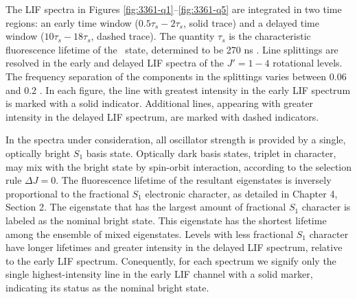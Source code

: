 \documentclass[12pt]{mitthesis}
\begin{document}
The LIF spectra in Figures \ref{fig:3361-q1}--\ref{fig:3361-q5} are
integrated in two time regions: an early time window
($0.5\tau_s-2\tau_s$, solid trace) and a delayed time window
($10\tau_s-18\tau_s$, dashed trace).  The quantity $\tau_s$ is the
characteristic fluorescence lifetime of the \astate\ state,
determined to be 270 ns \cite{ochi91}.  Line splittings are resolved
in the early and delayed LIF spectra of the $J'=1-4$ rotational
levels.  The frequency separation of the components in the splittings
varies between 0.06 and 0.2 \rcm.  In each figure, the line with
greatest intensity in the early LIF spectrum is marked with a solid
indicator.  Additional lines, appearing with greater intensity in the
delayed LIF spectrum, are marked with dashed indicators.

In the spectra under consideration, all oscillator strength is
provided by a single, optically bright $S_1$ basis state.  Optically
dark basis states, triplet in character, may mix with the bright state
by spin-orbit interaction, according to the selection rule $\Delta J =
0$.  The fluorescence lifetime of the resultant eigenstates is
inversely proportional to the fractional $S_1$ electronic character,
as detailed in Chapter 4, Section 2.  The eigenstate that has the
largest amount of fractional $S_1$ character is labeled as the nominal
bright state.  This eigenstate has the shortest lifetime among the
ensemble of mixed eigenstates.  Levels with less fractional $S_1$
character have longer lifetimes and greater intensity in the delayed
LIF spectrum, relative to the early LIF spectrum.  Conequently, for
each spectrum we signify only the single highest-intensity line in the
early LIF channel with a solid marker, indicating its status as the
nominal bright state.

\end{document}

